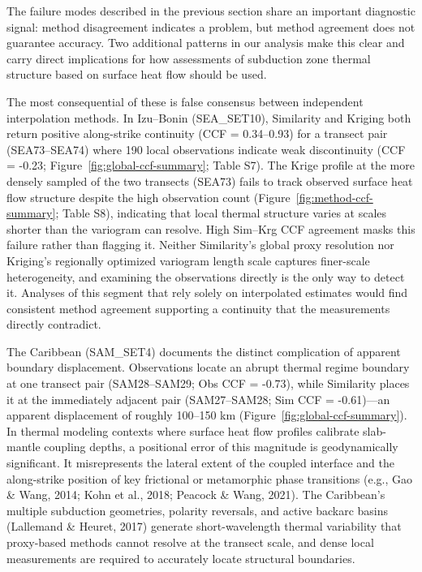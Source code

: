 \documentclass[draft,linenumbers]{agujournal2019}
\begin{document}
The failure modes described in the previous section share an important
diagnostic signal: method disagreement indicates a problem, but method
agreement does not guarantee accuracy. Two additional patterns in our
analysis make this clear and carry direct implications for how
assessments of subduction zone thermal structure based on surface heat
flow should be used.

The most consequential of these is false consensus between independent
interpolation methods. In Izu--Bonin (SEA\_SET10), Similarity and
Kriging both return positive along-strike continuity (CCF = 0.34--0.93)
for a transect pair (SEA73--SEA74) where 190 local observations indicate
weak discontinuity (CCF = -0.23; Figure~\ref{fig:global-ccf-summary};
Table S7). The Krige profile at the more densely sampled of the two
transects (SEA73) fails to track observed surface heat flow structure
despite the high observation count (Figure~\ref{fig:method-ccf-summary};
Table S8), indicating that local thermal structure varies at scales
shorter than the variogram can resolve. High Sim--Krg CCF agreement
masks this failure rather than flagging it. Neither Similarity's global
proxy resolution nor Kriging's regionally optimized variogram length
scale captures finer-scale heterogeneity, and examining the observations
directly is the only way to detect it. Analyses of this segment that
rely solely on interpolated estimates would find consistent method
agreement supporting a continuity that the measurements directly
contradict.

The Caribbean (SAM\_SET4) documents the distinct complication of
apparent boundary displacement. Observations locate an abrupt thermal
regime boundary at one transect pair (SAM28--SAM29; Obs CCF = -0.73),
while Similarity places it at the immediately adjacent pair
(SAM27--SAM28; Sim CCF = -0.61)---an apparent displacement of roughly
100--150 km (Figure~\ref{fig:global-ccf-summary}). In thermal modeling
contexts where surface heat flow profiles calibrate slab-mantle coupling
depths, a positional error of this magnitude is geodynamically
significant. It misrepresents the lateral extent of the coupled
interface and the along-strike position of key frictional or metamorphic
phase transitions (e.g., Gao \& Wang, 2014; Kohn et al., 2018; Peacock
\& Wang, 2021). The Caribbean's multiple subduction geometries, polarity
reversals, and active backarc basins (Lallemand \& Heuret, 2017)
generate short-wavelength thermal variability that proxy-based methods
cannot resolve at the transect scale, and dense local measurements are
required to accurately locate structural boundaries.
\end{document}

